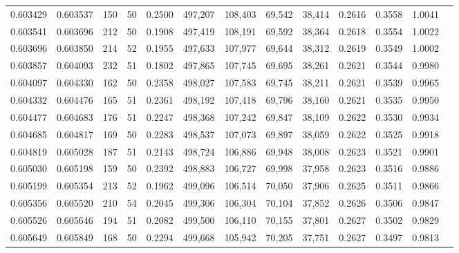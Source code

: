 \begin{tabular}{rrrrrrrrrrrrr}
0.603429 & 0.603537 &   150 &  50 &                                     0.2500 & 497,207 & 108,403 &  69,542 &  38,414 & 0.2616 & 0.3558 & 1.0041 \\
0.603541 & 0.603696 &   212 &  50 &                                     0.1908 & 497,419 & 108,191 &  69,592 &  38,364 & 0.2618 & 0.3554 & 1.0022 \\
0.603696 & 0.603850 &   214 &  52 &                                     0.1955 & 497,633 & 107,977 &  69,644 &  38,312 & 0.2619 & 0.3549 & 1.0002 \\
0.603857 & 0.604093 &   232 &  51 &                                     0.1802 & 497,865 & 107,745 &  69,695 &  38,261 & 0.2621 & 0.3544 & 0.9980 \\
0.604097 & 0.604330 &   162 &  50 &                                     0.2358 & 498,027 & 107,583 &  69,745 &  38,211 & 0.2621 & 0.3539 & 0.9965 \\
0.604332 & 0.604476 &   165 &  51 &                                     0.2361 & 498,192 & 107,418 &  69,796 &  38,160 & 0.2621 & 0.3535 & 0.9950 \\
0.604477 & 0.604683 &   176 &  51 &                                     0.2247 & 498,368 & 107,242 &  69,847 &  38,109 & 0.2622 & 0.3530 & 0.9934 \\
0.604685 & 0.604817 &   169 &  50 &                                     0.2283 & 498,537 & 107,073 &  69,897 &  38,059 & 0.2622 & 0.3525 & 0.9918 \\
0.604819 & 0.605028 &   187 &  51 &                                     0.2143 & 498,724 & 106,886 &  69,948 &  38,008 & 0.2623 & 0.3521 & 0.9901 \\
0.605030 & 0.605198 &   159 &  50 &                                     0.2392 & 498,883 & 106,727 &  69,998 &  37,958 & 0.2623 & 0.3516 & 0.9886 \\
0.605199 & 0.605354 &   213 &  52 &                                     0.1962 & 499,096 & 106,514 &  70,050 &  37,906 & 0.2625 & 0.3511 & 0.9866 \\
0.605356 & 0.605520 &   210 &  54 &                                     0.2045 & 499,306 & 106,304 &  70,104 &  37,852 & 0.2626 & 0.3506 & 0.9847 \\
0.605526 & 0.605646 &   194 &  51 &                                     0.2082 & 499,500 & 106,110 &  70,155 &  37,801 & 0.2627 & 0.3502 & 0.9829 \\
0.605649 & 0.605849 &   168 &  50 &                                     0.2294 & 499,668 & 105,942 &  70,205 &  37,751 & 0.2627 & 0.3497 & 0.9813 \\

\end{tabular}
